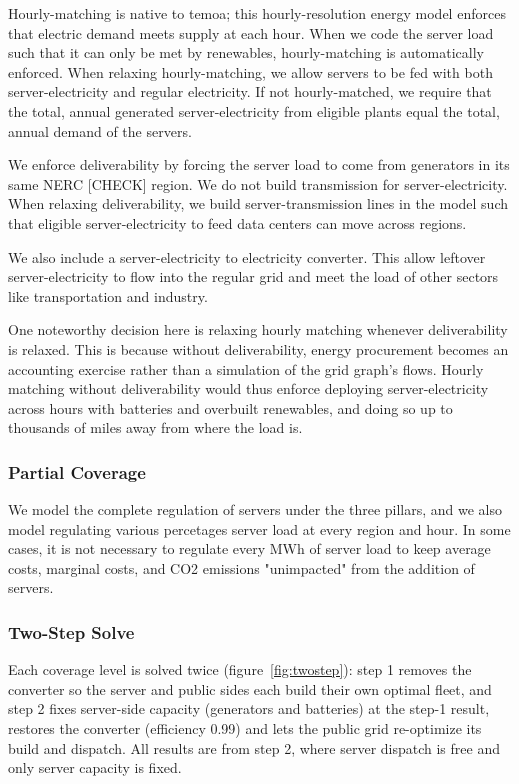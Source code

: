 \documentclass{iopjournal}
\begin{document}
Hourly-matching is native to temoa; this hourly-resolution energy model enforces that electric demand meets supply at each hour. When we code the server load such that it can only be met by renewables, hourly-matching is automatically enforced. When relaxing hourly-matching, we allow servers to be fed with both server-electricity and regular electricity. If not hourly-matched, we require that the total, annual generated server-electricity from eligible plants equal the total, annual demand of the servers. 

We enforce deliverability by forcing the server load to come from generators in its same NERC [CHECK] region. We do not build transmission for server-electricity. When relaxing deliverability, we build server-transmission lines in the model such that eligible server-electricity to feed data centers can move across regions. 

We also include a server-electricity to electricity converter. This allow leftover server-electricity to flow into the regular grid and meet the load of other sectors like transportation and industry. 

One noteworthy decision here is relaxing hourly matching whenever deliverability is relaxed. This is because without deliverability, energy procurement becomes an accounting exercise rather than a simulation of the grid graph's flows. Hourly matching without deliverability would thus enforce deploying server-electricity across hours with batteries and overbuilt renewables, and doing so up to thousands of miles away from where the load is. 

\subsubsection{Partial Coverage}
We model the complete regulation of servers under the three pillars, and we also model regulating various percetages server load at every region and hour. In some cases, it is not necessary to regulate every MWh of server load to keep average costs, marginal costs, and CO2 emissions "unimpacted" from the addition of servers.

\subsubsection{Two-Step Solve}
Each coverage level is solved twice (figure~\ref{fig:twostep}): step 1 removes the converter so the server and public sides each build their own optimal fleet, and step 2 fixes server-side capacity (generators and batteries) at the step-1 result, restores the converter (efficiency 0.99) and lets the public grid re-optimize its build and dispatch. All results are from step 2, where server dispatch is free and only server capacity is fixed.
\end{document}
